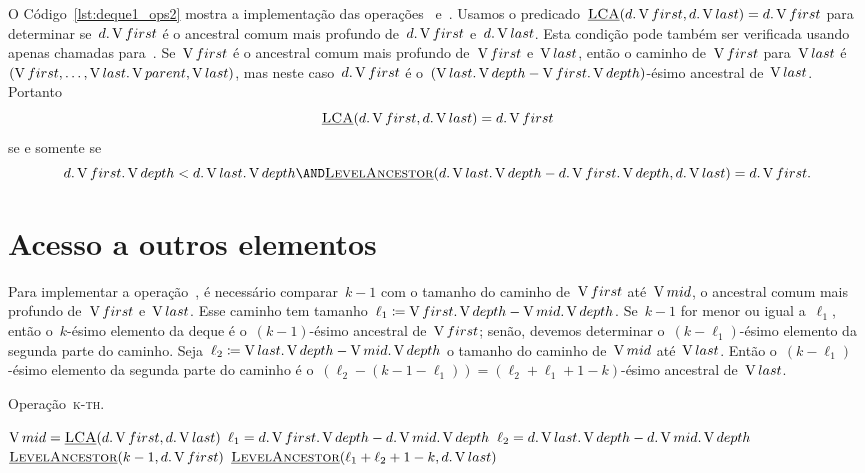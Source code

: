 \documentclass[main.tex]{subfiles}
\begin{document}
O Código~\ref{lst:deque1_ops2} mostra a implementação das operações~ e~. Usamos o predicado~${\mbox{\textsc{\underline{LCA}}\ensuremath{(d.\operatorname{V}{first}, d.\operatorname{V}{last})}} = d.\operatorname{V}{first}}$ para determinar se~$d.\operatorname{V}{first}$ é o ancestral comum mais profundo de~$d.\operatorname{V}{first}$ e~$d.\operatorname{V}{last}$. Esta condição pode também ser verificada usando apenas chamadas para~\mbox{}. Se~$\operatorname{V}{first}$ é o ancestral comum mais profundo de~$\operatorname{V}{first}$ e~$\operatorname{V}{last}$, então o caminho de~$\operatorname{V}{first}$ para~$\operatorname{V}{last}$ é~${(\operatorname{V}{first}, \ldots, \operatorname{V}{last}.\operatorname{V}{parent}, \operatorname{V}{last})}$, mas neste caso~$d.\operatorname{V}{first}$ é o~${(\operatorname{V}{last}.\operatorname{V}{depth} - \operatorname{V}{first}.\operatorname{V}{depth})}$-ésimo ancestral de~$\operatorname{V}{last}$. Portanto $$ \mbox{\textsc{\underline{LCA}}\ensuremath{(d.\operatorname{V}{first}, d.\operatorname{V}{last})}} = d.\operatorname{V}{first} $$ se e somente se $$ d.\V{first}.\V{depth} < d.\V{last}.\V{depth} \AND \funcAPI{LevelAncestor}{d.\V{last}.\V{depth} - d.\V{first}.\V{depth}, d.\V{last}} = d.\V{first}. $$

\section{Acesso a outros elementos}

Para implementar a operação~, é necessário comparar~$k-1$ com o tamanho do caminho de~$\operatorname{V}{first}$ até~$\operatorname{V}{mid}$, o ancestral comum mais profundo de~$\operatorname{V}{first}$ e~$\operatorname{V}{last}$. Esse caminho tem tamanho~${\ell_1 \coloneqq \operatorname{V}{first}.\operatorname{V}{depth} - \operatorname{V}{mid}.\operatorname{V}{depth}}$. Se~$k-1$ for menor ou igual a~$\ell_1$, então o~$k$-ésimo elemento da deque é o~$(k-1)$-ésimo ancestral de~$\operatorname{V}{first}$; senão, devemos determinar o~$(k-\ell_1)$-ésimo elemento da segunda parte do caminho. Seja~${\ell_2 \coloneqq \operatorname{V}{last}.\operatorname{V}{depth} - \operatorname{V}{mid}.\operatorname{V}{depth}}$ o tamanho do caminho de~$\operatorname{V}{mid}$ até~$\operatorname{V}{last}$. Então o~$(k-\ell_1)$-ésimo elemento da segunda parte do caminho é o~$(\ell_2 - (k-1-\ell_1)) = (\ell_2 + \ell_1 + 1 - k)$-ésimo ancestral de~$\operatorname{V}{last}$.

\begin{algorithm}
\caption{Operação~\textsc{k-th}.} \label{lst:deque1_ops3}
\begin{algorithmic}[1]

	\State $\operatorname{V}{mid} = \mbox{\textsc{\underline{LCA}}\ensuremath{(d.\operatorname{V}{first}, d.\operatorname{V}{last})}}$
	\State $\ell_1 = d.\operatorname{V}{first}.\operatorname{V}{depth} - d.\operatorname{V}{mid}.\operatorname{V}{depth}$
	\State $\ell_2 = d.\operatorname{V}{last}.\operatorname{V}{depth} - d.\operatorname{V}{mid}.\operatorname{V}{depth}$
		\State \Return $\mbox{\textsc{\underline{LevelAncestor}}\ensuremath{(k - 1, d.\operatorname{V}{first})}}$
	\Else
		\State \Return $\mbox{\textsc{\underline{LevelAncestor}}\ensuremath{(\ell_1 + \ell_2 + 1 - k, d.\operatorname{V}{last})}}$
	\EndIf
\EndFunction

\end{algorithmic}
\end{algorithm}
\end{document}
